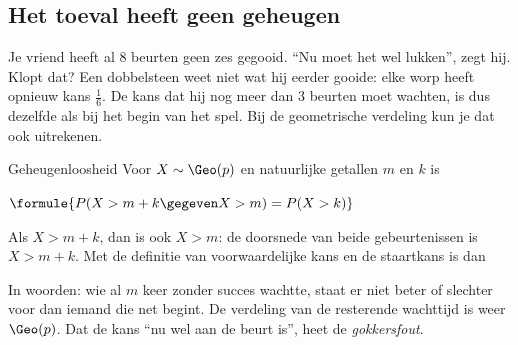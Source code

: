 \begin{oefeningen}
\end{oefeningen}

\subsection{Het toeval heeft geen geheugen}

Je vriend heeft al 8 beurten geen zes gegooid. ``Nu moet het wel lukken'', zegt hij. Klopt dat? Een dobbelsteen weet niet wat hij eerder gooide: elke worp heeft opnieuw kans $\frac16$. De kans dat hij nog meer dan 3 beurten moet wachten, is dus dezelfde als bij het begin van het spel. Bij de geometrische verdeling kun je dat ook uitrekenen.

\begin{theorie}
\begin{stelling}{Geheugenloosheid}
Voor $X \sim \Geo(p)$ en natuurlijke getallen $m$ en $k$ is

\vspace{1mm}
\qquad $\formule{P(X > m + k \gegeven X > m) = P(X > k)}$
\end{stelling}

\begin{bewijs}
Als $X > m + k$, dan is ook $X > m$: de doorsnede van beide gebeurtenissen is $X > m + k$. Met de definitie van voorwaardelijke kans en de staartkans is dan
\end{bewijs}
\end{theorie}

In woorden: wie al $m$ keer zonder succes wachtte, staat er niet beter of slechter voor dan iemand die net begint. De verdeling van de resterende wachttijd is weer $\Geo(p)$. Dat de kans ``nu wel aan de beurt is'', heet de \textit{gokkersfout}.


